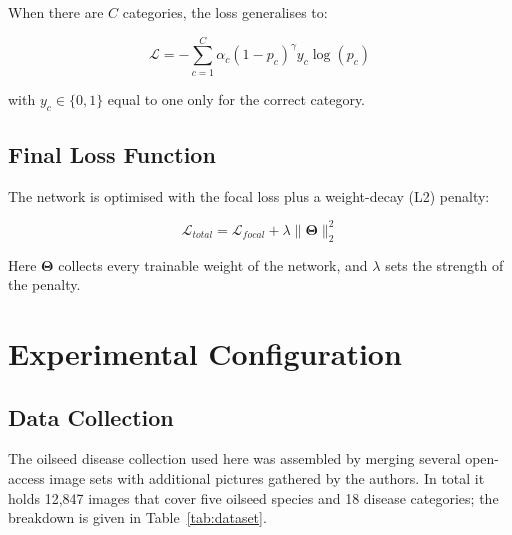 \documentclass[default, iicol]{sn-jnl}
\theoremstyle{thmstyleone}%
\theoremstyle{thmstyletwo}%
\theoremstyle{thmstylethree}%
\begin{document}
When there are $C$ categories, the loss generalises to:

\begin{equation}
\mathcal{L} = -\sum_{c=1}^{C} \alpha_c (1-p_c)^\gamma y_c \log(p_c)
\label{eq:multiclass_focal}
\end{equation}

with $y_c \in \{0,1\}$ equal to one only for the correct category.

\subsection{Final Loss Function}

The network is optimised with the focal loss plus a weight-decay (L2) penalty:

\begin{equation}
\mathcal{L}_{total} = \mathcal{L}_{focal} + \lambda \|\mathbf{\Theta}\|_2^2
\label{eq:total_loss}
\end{equation}

Here $\mathbf{\Theta}$ collects every trainable weight of the network, and $\lambda$ sets the strength of the penalty.

\section{Experimental Configuration}\label{sec:experiments}

\subsection{Data Collection}

The oilseed disease collection used here was assembled by merging several open-access image sets with additional pictures gathered by the authors. In total it holds 12,847 images that cover five oilseed species and 18 disease categories; the breakdown is given in Table~\ref{tab:dataset}.
\end{document}
